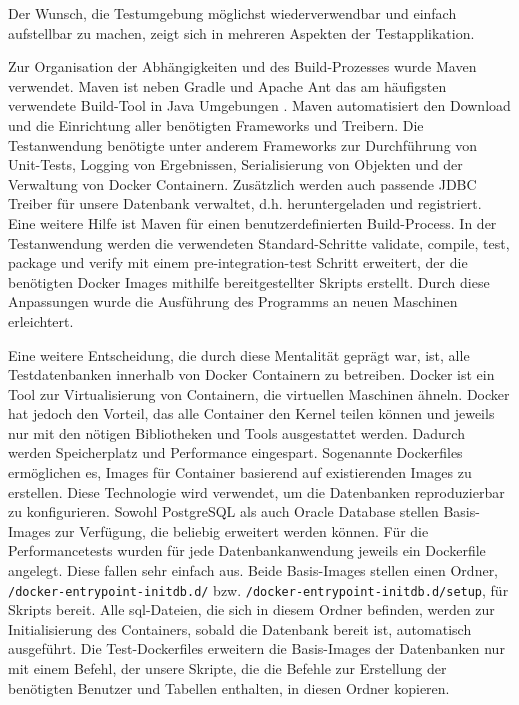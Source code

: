 Der Wunsch, die Testumgebung möglichst wiederverwendbar und einfach aufstellbar zu machen, zeigt sich in mehreren Aspekten der Testapplikation.

Zur Organisation der Abhängigkeiten und des Build-Prozesses wurde Maven verwendet. Maven ist neben Gradle und Apache Ant das am häufigsten verwendete Build-Tool in Java Umgebungen \cite{Sulir.2016}. Maven automatisiert den Download und die Einrichtung aller benötigten Frameworks und Treibern. Die Testanwendung benötigte unter anderem Frameworks zur Durchführung von Unit-Tests, Logging von Ergebnissen, Serialisierung von Objekten und der Verwaltung von Docker Containern. Zusätzlich werden auch passende JDBC Treiber für unsere Datenbank verwaltet, d.h. heruntergeladen und registriert. Eine weitere Hilfe ist Maven für einen benutzerdefinierten Build-Process. In der Testanwendung werden die verwendeten Standard-Schritte validate, compile, test, package und verify mit einem pre-integration-test Schritt erweitert, der die benötigten Docker Images mithilfe bereitgestellter Skripts erstellt. Durch diese Anpassungen wurde die Ausführung des Programms an neuen Maschinen erleichtert.

Eine weitere Entscheidung, die durch diese Mentalität geprägt war, ist, alle Testdatenbanken innerhalb von Docker Containern zu betreiben. Docker ist ein Tool zur Virtualisierung von Containern, die virtuellen Maschinen ähneln. Docker hat jedoch den Vorteil, das alle Container den Kernel teilen können und jeweils nur mit den nötigen Bibliotheken und Tools ausgestattet werden. Dadurch werden Speicherplatz und Performance eingespart. 
Sogenannte Dockerfiles ermöglichen es, Images für Container basierend auf existierenden Images zu erstellen. Diese Technologie wird verwendet, um die Datenbanken reproduzierbar zu konfigurieren. Sowohl PostgreSQL als auch Oracle Database stellen Basis-Images zur Verfügung, die beliebig erweitert werden können. 
Für die Performancetests wurden für jede Datenbankanwendung jeweils ein Dockerfile angelegt. Diese fallen sehr einfach aus. Beide Basis-Images stellen einen Ordner, \lstinline|/docker-entrypoint-initdb.d/| bzw. \lstinline|/docker-entrypoint-initdb.d/setup|, für Skripts bereit. Alle sql-Dateien, die sich in diesem Ordner befinden, werden zur Initialisierung des Containers, sobald die Datenbank bereit ist, automatisch ausgeführt. Die Test-Dockerfiles erweitern die Basis-Images der Datenbanken nur mit einem Befehl, der unsere Skripte, die die Befehle zur Erstellung der benötigten Benutzer und Tabellen enthalten, in diesen Ordner kopieren.

